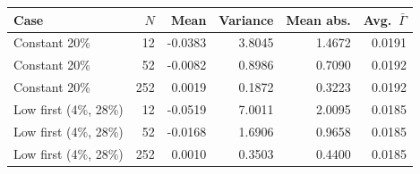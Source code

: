 \begin{tabular}{lrrrrr}
\toprule
Case & $N$ & Mean & Variance & Mean abs. & Avg.\ $\bar\Gamma$ \\
\midrule
Constant 20\% & 12 & -0.0383 & 3.8045 & 1.4672 & 0.0191 \\
Constant 20\% & 52 & -0.0082 & 0.8986 & 0.7090 & 0.0192 \\
Constant 20\% & 252 & 0.0019 & 0.1872 & 0.3223 & 0.0192 \\
Low first (4\%, 28\%) & 12 & -0.0519 & 7.0011 & 2.0095 & 0.0185 \\
Low first (4\%, 28\%) & 52 & -0.0168 & 1.6906 & 0.9658 & 0.0185 \\
Low first (4\%, 28\%) & 252 & 0.0010 & 0.3503 & 0.4400 & 0.0185 \\
\bottomrule
\end{tabular}
